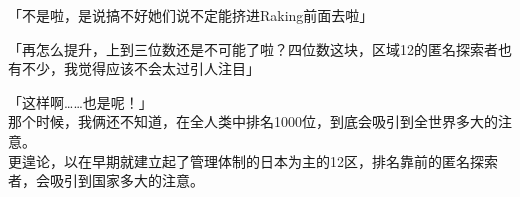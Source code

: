 「不是啦，是说搞不好她们说不定能挤进Raking前面去啦」

「再怎么提升，上到三位数还是不可能了啦？四位数这块，区域12的匿名探索者也有不少，我觉得应该不会太过引人注目」

「这样啊……也是呢！」\\

那个时候，我俩还不知道，在全人类中排名1000位，到底会吸引到全世界多大的注意。\\

更遑论，以在早期就建立起了管理体制的日本为主的12区，排名靠前的匿名探索者，会吸引到国家多大的注意。\\
